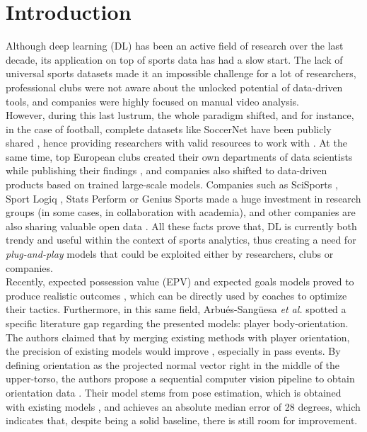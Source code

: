 \documentclass{article}
\begin{document}
\section{Introduction}
Although deep learning (DL) has been an active field of research over the last decade, its application on top of sports data has had a slow start. The lack of universal sports datasets made it an impossible challenge for a lot of researchers, professional clubs were not aware about the unlocked potential of data-driven tools, and companies were highly focused on manual video analysis.\\
However, during this last lustrum, the whole paradigm shifted, and for instance, in the case of football, complete datasets like SoccerNet have been publicly shared
\cite{giancola2018soccernet,deliege2020soccernet}, hence providing researchers with valid resources to work with \cite{cioppa2019arthus,cioppa2020context}. At the same time, top European clubs created their own departments of data scientists while publishing their findings \cite{fernandez2018wide,llana2020right}, and companies also shifted to data-driven products based on trained large-scale models. Companies such as SciSports \cite{decroos2019actions,bransen2020player}, Sport Logiq \cite{sanford2020group}, Stats Perform \cite{sha2020end,power21} or Genius Sports \cite{quiroga2020seen} made a huge investment in research groups (in some cases, in collaboration with academia), and other companies are also sharing valuable open data \cite{metricasports,statsbomb,skillcorner}. All these facts prove that, DL is currently both trendy and useful within the context of sports analytics, thus creating a need for \textit{plug-and-play} models that could be exploited either by researchers, clubs or companies. \\
Recently, expected possession value (EPV) and expected goals models proved to produce realistic outcomes \cite{spearman2017physics,spearman2018beyond,fernandez2019decomposing}, which can be directly used by coaches to optimize their tactics. Furthermore, in this same field, Arbués-Sangüesa \textit{et al.} spotted a specific literature gap regarding the presented models: player body-orientation. The authors claimed that by merging existing methods with player orientation, the precision of existing models would improve \cite{arbues2020using}, especially in pass events. By defining orientation as the projected normal vector right in the middle of the upper-torso, the authors propose a sequential computer vision pipeline to obtain orientation data \cite{arbues2020always}. Their model stems from pose estimation, which is obtained with existing models \cite{ramakrishna2014pose,wei2016convolutional,cao2017realtime}, and achieves an absolute median error of 28 degrees, which indicates that, despite being a solid baseline, there is still room for improvement. \\ %
\end{document}
